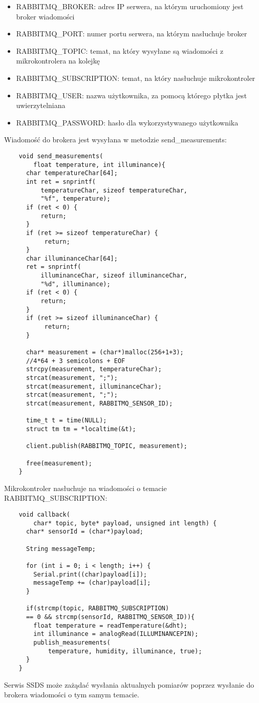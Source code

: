 \begin{itemize}
    \item RABBITMQ\_BROKER: adres IP serwera, na którym uruchomiony jest broker wiadomości
    \item RABBITMQ\_PORT: numer portu serwera, na którym nasłuchuje broker
    \item RABBITMQ\_TOPIC: temat, na który wysyłane są wiadomości z mikrokontrolera
    na kolejkę
    \item RABBITMQ\_SUBSCRIPTION: temat, na który nasłuchuje mikrokontroler
    \item RABBITMQ\_USER: nazwa użytkownika, za pomocą którego płytka jest uwierzytelniana
    \item RABBITMQ\_PASSWORD: hasło dla wykorzystywanego użytkownika
\end{itemize}

Wiadomość do brokera jest wysyłana w metodzie send\_measurements:

\begin{lstlisting}
    void send_measurements(
        float temperature, int illuminance){
      char temperatureChar[64];
      int ret = snprintf(
          temperatureChar, sizeof temperatureChar, 
          "%f", temperature);
      if (ret < 0) {
          return;
      }
      if (ret >= sizeof temperatureChar) {
           return;
      }
      char illuminanceChar[64];
      ret = snprintf(
          illuminanceChar, sizeof illuminanceChar, 
          "%d", illuminance);
      if (ret < 0) {
          return;
      }
      if (ret >= sizeof illuminanceChar) {
           return;
      }
    
      char* measurement = (char*)malloc(256+1+3); 
      //4*64 + 3 semicolons + EOF
      strcpy(measurement, temperatureChar);
      strcat(measurement, ";");
      strcat(measurement, illuminanceChar);
      strcat(measurement, ";");
      strcat(measurement, RABBITMQ_SENSOR_ID);
    
      time_t t = time(NULL);
      struct tm tm = *localtime(&t);
    
      client.publish(RABBITMQ_TOPIC, measurement);
    
      free(measurement);
    }
\end{lstlisting}

Mikrokontroler nasłuchuje na wiadomości o temacie \\RABBITMQ\_SUBSCRIPTION:

\begin{lstlisting}
    void callback(
        char* topic, byte* payload, unsigned int length) {
      char* sensorId = (char*)payload;
    
      String messageTemp;
      
      for (int i = 0; i < length; i++) {
        Serial.print((char)payload[i]);
        messageTemp += (char)payload[i];
      }
    
      if(strcmp(topic, RABBITMQ_SUBSCRIPTION) 
      == 0 && strcmp(sensorId, RABBITMQ_SENSOR_ID)){
        float temperature = readTemperature(&dht);
        int illuminance = analogRead(ILLUMINANCEPIN);
        publish_measurements(
            temperature, humidity, illuminance, true);
      }
    }
\end{lstlisting}

Serwis SSDS może zażądać wysłania aktualnych pomiarów poprzez wysłanie do brokera 
wiadomości o tym samym temacie.